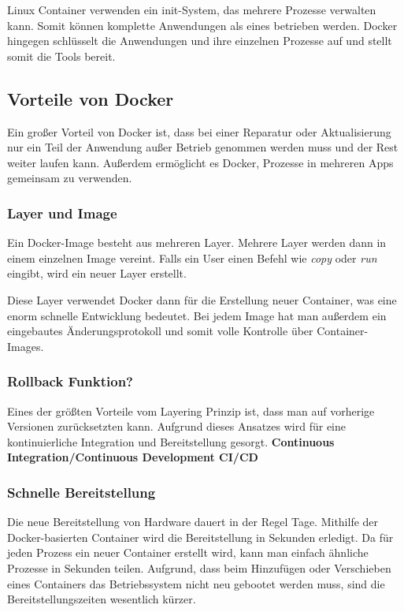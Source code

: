 Linux Container verwenden ein init-System, das mehrere Prozesse verwalten kann. Somit können
komplette Anwendungen als eines betrieben werden. Docker hingegen schlüsselt die Anwendungen und
ihre einzelnen Prozesse auf und stellt somit die Tools bereit.

\subsection{Vorteile von Docker}
Ein großer Vorteil von Docker ist, dass bei einer Reparatur oder
Aktualisierung nur ein Teil der Anwendung außer Betrieb genommen werden muss und
der Rest weiter laufen kann. Außerdem ermöglicht es Docker, Prozesse in mehreren
Apps gemeinsam zu verwenden.

\subsubsection{Layer und Image}
Ein Docker-Image besteht aus mehreren Layer. Mehrere Layer werden dann
in einem einzelnen Image vereint. Falls ein User einen Befehl wie \textit{copy}
oder \textit{run} eingibt, wird ein neuer Layer erstellt.

Diese Layer verwendet Docker dann für die Erstellung neuer Container, was eine enorm schnelle
Entwicklung bedeutet. Bei jedem Image hat man außerdem ein eingebautes Änderungsprotokoll
und somit volle Kontrolle über Container-Images.

\subsubsection{Rollback Funktion?}
Eines der größten Vorteile vom Layering Prinzip ist, dass man auf vorherige Versionen
zurücksetzten kann. Aufgrund dieses Ansatzes wird für eine kontinuierliche Integration und
Bereitstellung gesorgt. \textbf{Continuous Integration/Continuous Development CI/CD}

\subsubsection{Schnelle Bereitstellung}
Die neue Bereitstellung von Hardware dauert in der Regel Tage. Mithilfe der Docker-basierten
Container wird die Bereitstellung in Sekunden erledigt. Da für jeden Prozess ein neuer Container
erstellt wird, kann man einfach ähnliche Prozesse in Sekunden teilen. Aufgrund, dass beim Hinzufügen
oder Verschieben eines Containers das Betriebssystem nicht neu gebootet werden muss, sind die
Bereitstellungszeiten wesentlich kürzer.

\cite{Docker}